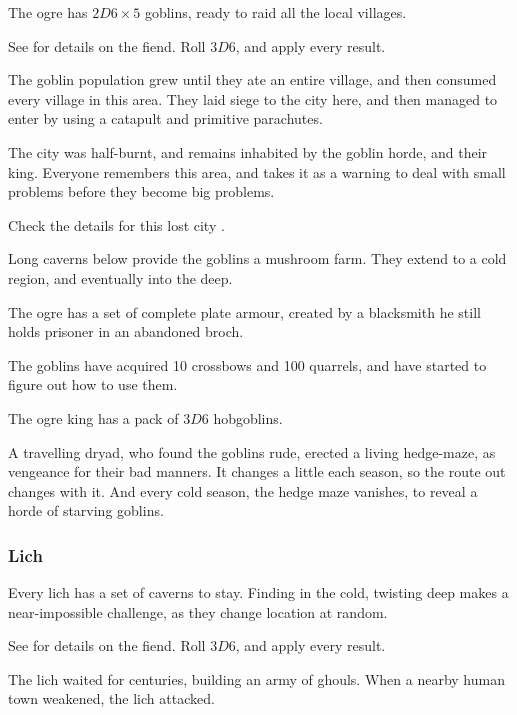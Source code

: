 \begin{multicols}{2}
The \gls{ogre} has $2D6 \times 5$ goblins, ready to raid all the local \glspl{village}.

See  for details on the fiend.
Roll $3D6$, and apply every result.

\begin{dlist}
  \item
  The goblin population grew until they ate an entire \gls{village}, and then consumed every \gls{village} in this area.
  They laid siege to the city here, and then managed to enter by using a catapult and primitive parachutes.

  The city was half-burnt, and remains inhabited by the goblin horde, and their king.
  Everyone remembers this area, and takes it as a warning to deal with small problems before they become big problems.

  Check the details for this lost city .
  \item
  Long caverns below provide the goblins a mushroom farm.
  They extend to a cold region, and eventually into the \gls{deep}.
  \item
  The \gls{ogre} has a set of complete plate armour, created by a blacksmith he still holds prisoner in an abandoned \gls{broch}.
  \item
  The goblins have acquired 10 crossbows and 100 quarrels, and have started to figure out how to use them.
  \item
  The \gls{ogre} king has a pack of $3D6$ hobgoblins.
  \item
  A travelling dryad, who found the goblins rude, erected a living hedge-maze, as vengeance for their bad manners.
  It changes a little each season, so the route out changes with it.
  And every cold season, the hedge maze vanishes, to reveal a horde of starving goblins.
\end{dlist}

\subsubsection{Lich}
\label{lichPoint}

Every \gls{lich} has a set of caverns to stay.
Finding  in the cold, twisting \gls{deep} makes a near-impossible challenge, as they change location at random.

See  for details on the fiend.
Roll $3D6$, and apply every result.

\begin{dlist}
  \item
  The \gls{lich} waited for centuries, building an army of ghouls.
  When a nearby human town weakened, the \gls{lich} attacked.


\end{dlist}
\end{multicols}

